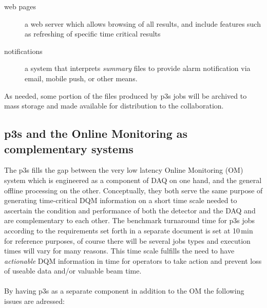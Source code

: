 \documentclass[pdftex,12pt,letter]{article}
\begin{document}
\begin{description}
\item[web pages] a web server which allows browsing of all results, and include features such as refreshing of specific time critical results
\item[notifications] a system that interprets \textit{summary} files to provide alarm notification via email, mobile push, or other means.
\end{description}

As needed, some portion of the files produced by p3s jobs will be
archived to mass storage and made available for distribution to the
collaboration.


\subsection{p3s and the Online Monitoring as complementary systems}
The p3s fills the gap between the very low latency Online Monitoring (OM)
system which is engineered as a component of DAQ on one hand, and
the general offline processing on the other. Conceptually, they both serve
the same purpose of generating time-critical DQM information on a short time
scale needed to ascertain the condition and performance of both the detector
and the DAQ and are complementary to each other. 
The benchmark turnaround time for p3s jobs 
according to the requirements set forth in a separate document 
\cite{docdb1811}  is set at 10\,min for reference purposes,
of course there will be several jobs types and execution times will
vary for many reasons. This time scale fulfills the need to have \textit{actionable}
DQM information in time for operators to take action and prevent loss
of useable data and/or valuable beam time.
\ \\
\\
\noindent By having p3s as a separate 
component in addition to the OM the following issues are adressed:
\end{document}
